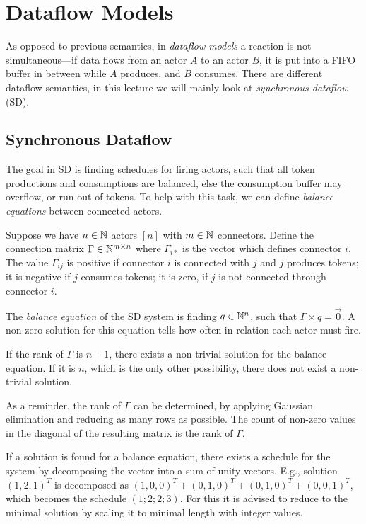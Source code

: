 \section{Dataflow Models}
As opposed to previous semantics, in \emph{dataflow models} a reaction is not simultaneous---if data flows from an actor \(A\) to an actor \(B\), it is put into a FIFO buffer in between while \(A\) produces, and \(B\) consumes.
There are different dataflow semantics, in this lecture we will mainly look at \emph{synchronous dataflow} (SD).

\subsection{Synchronous Dataflow}
The goal in SD is finding schedules for firing actors, such that all token productions and consumptions are balanced, else the consumption buffer may overflow, or run out of tokens.
To help with this task, we can define \emph{balance equations} between connected actors.

\begin{definition}
    Suppose we have \(n \in \mathbb N\) actors \([n]\) with \(m \in \mathbb N\) connectors.
    Define the connection matrix \(\Gamma \in \mathbb N^{m \times n}\) where \(\Gamma_{i*}\) is the vector which defines connector \(i\).
    The value \(\Gamma_{ij}\) is positive if connector \(i\) is connected with \(j\) and \(j\) produces tokens;
    it is negative if \(j\) consumes tokens;
    it is zero, if \(j\) is not connected through connector \(i\).

    The \emph{balance equation} of the SD system is finding \(q \in \mathbb N^n\), such that \(\Gamma \times q = \vec 0\).
    A non-zero solution for this equation tells how often in relation each actor must fire.

    If the rank of \(\Gamma\) is \(n-1\), there exists a non-trivial solution for the balance equation.
    If it is \(n\), which is the only other possibility, there does not exist a non-trivial solution.

    As a reminder, the rank of \(\Gamma\) can be determined, by applying Gaussian elimination and reducing as many rows as possible.
    The count of non-zero values in the diagonal of the resulting matrix is the rank of \(\Gamma\).
\end{definition}

If a solution is found for a balance equation, there exists a schedule for the system by decomposing the vector into a sum of unity vectors.
E.g., solution \((1,2,1)^T\) is decomposed as \((1,0,0)^T + (0,1,0)^T + (0,1,0)^T + (0,0,1)^T\), which becomes the schedule \((1;2;2;3)\).
For this it is advised to reduce to the minimal solution by scaling it to minimal length with integer values.

